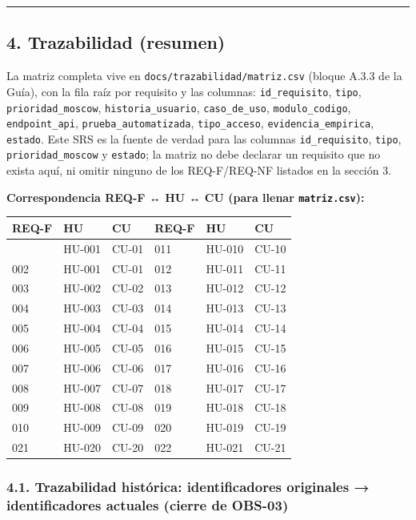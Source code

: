 \documentclass[
]{article}
\begin{document}
\begin{center}\rule{0.5\linewidth}{0.5pt}\end{center}

\hypertarget{trazabilidad-resumen}{%
\subsection{4. Trazabilidad (resumen)}\label{trazabilidad-resumen}}

La matriz completa vive en \texttt{docs/trazabilidad/matriz.csv} (bloque
A.3.3 de la Guía), con la fila raíz por requisito y las columnas:
\texttt{id\_requisito}, \texttt{tipo}, \texttt{prioridad\_moscow},
\texttt{historia\_usuario}, \texttt{caso\_de\_uso},
\texttt{modulo\_codigo}, \texttt{endpoint\_api},
\texttt{prueba\_automatizada}, \texttt{tipo\_acceso},
\texttt{evidencia\_empirica}, \texttt{estado}. Este SRS es la fuente de
verdad para las columnas \texttt{id\_requisito}, \texttt{tipo},
\texttt{prioridad\_moscow} y \texttt{estado}; la matriz no debe declarar
un requisito que no exista aquí, ni omitir ninguno de los REQ-F/REQ-NF
listados en la sección 3.

\textbf{Correspondencia REQ-F ↔ HU ↔ CU (para llenar
\texttt{matriz.csv}):}

\begin{longtable}[]{@{}llllll@{}}
\toprule\noalign{}
REQ-F & HU & CU & REQ-F & HU & CU \\
\midrule\noalign{}
\endhead
\bottomrule\noalign{}
\endlastfoot
001 & HU-001 & CU-01 & 011 & HU-010 & CU-10 \\
002 & HU-001 & CU-01 & 012 & HU-011 & CU-11 \\
003 & HU-002 & CU-02 & 013 & HU-012 & CU-12 \\
004 & HU-003 & CU-03 & 014 & HU-013 & CU-13 \\
005 & HU-004 & CU-04 & 015 & HU-014 & CU-14 \\
006 & HU-005 & CU-05 & 016 & HU-015 & CU-15 \\
007 & HU-006 & CU-06 & 017 & HU-016 & CU-16 \\
008 & HU-007 & CU-07 & 018 & HU-017 & CU-17 \\
009 & HU-008 & CU-08 & 019 & HU-018 & CU-18 \\
010 & HU-009 & CU-09 & 020 & HU-019 & CU-19 \\
021 & HU-020 & CU-20 & 022 & HU-021 & CU-21 \\
\end{longtable}

\hypertarget{trazabilidad-histuxf3rica-identificadores-originales-identificadores-actuales-cierre-de-obs-03}{%
\subsubsection{4.1. Trazabilidad histórica: identificadores originales →
identificadores actuales (cierre de
OBS-03)}\label{trazabilidad-histuxf3rica-identificadores-originales-identificadores-actuales-cierre-de-obs-03}}
\end{document}
